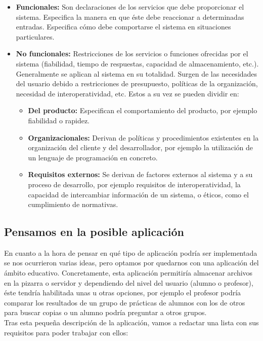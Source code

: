\begin{itemize}
	\item \textbf{Funcionales: }Son declaraciones de los servicios que debe proporcionar el sistema. Especifica la manera en que éste debe reaccionar a determinadas entradas. Especifica cómo debe comportarse el sistema en situaciones particulares.
	\item \textbf{No funcionales: } Restricciones de los servicios o funciones ofrecidas por el sistema (fiabilidad, tiempo de respuestas, capacidad de almacenamiento, etc.). Generalmente se aplican al sistema en su totalidad. Surgen de las necesidades del usuario debido a restricciones de presupuesto, políticas de la organización, necesidad de interoperatividad, etc. Estos a su vez se pueden dividir en:
	\begin{itemize}
		\item\textbf{Del producto:} Especifican el comportamiento del producto, por ejemplo fiabilidad o rapidez.
		\item\textbf{Organizacionales:} Derivan de políticas y procedimientos existentes en la organización del cliente y del desarrollador, por ejemplo la utilización de un lenguaje de programación en concreto.
		\item\textbf{Requisitos externos:} Se derivan de factores externos al sistema y a su proceso de desarrollo, por ejemplo requisitos de interoperatividad, la capacidad de intercambiar información de un sistema, o éticos, como el cumplimiento de normativas.
	\end{itemize}
\end{itemize}

\subsection{Pensamos en la posible aplicación}

En cuanto a la hora de pensar en qué tipo de aplicación podría ser implementada se nos ocurrieron varias ideas\cite{discusionaplicacion}, pero optamos por quedarnos con una aplicación del ámbito educativo. Concretamente, esta aplicación permitiría almacenar archivos en la pizarra o servidor y dependiendo del nivel del usuario (alumno o profesor), éste tendría habilitada unas u otras opciones, por ejemplo el profesor podría comparar los resultados de un grupo de prácticas de alumnos con los de otros para buscar copias o un alumno podría preguntar a otros grupos.\\

Tras esta pequeña descripción de la aplicación, vamos a redactar una lista con sus requisitos para poder trabajar con ellos:

